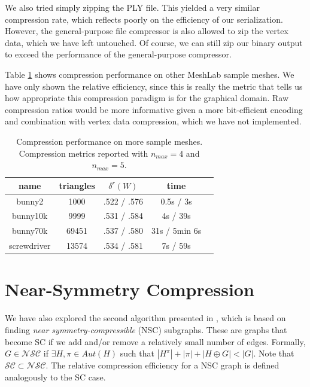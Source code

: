 \documentclass{egpubl}
\begin{document}
We also tried simply zipping the PLY file. This yielded a very similar compression rate, which reflects poorly on the efficiency of our serialization. However, the general-purpose file compressor is also allowed to zip the vertex data, which we have left untouched. Of course, we can still zip our binary output to exceed the performance of the general-purpose compressor.


Table \ref{tab:more_meshes} shows compression performance on other MeshLab sample meshes.
We have only shown the relative efficiency, since this is really the metric that tells us how appropriate this compression paradigm is for the graphical domain. Raw compression ratios would be more informative given a more bit-efficient encoding and combination with vertex data compression, which we have not implemented.

\begin{table}
\centering
\begin{tabular}{|c|c|c|c|c|}
\hline
name & triangles & $\delta^r(W)$ & time \\
\hline
bunny2 & 1000 & .522 / .576 & 0.5s / 3s \\
bunny10k & 9999 & .531 / .584 & 4s / 39s \\
bunny70k & 69451 & .537 / .580 & 31s / 5min 6s \\
screwdriver & 13574 & .534 / .581 & 7s / 59s \\
\hline
\end{tabular}
\caption{Compression performance on more sample meshes. Compression metrics reported with $n_{max} = 4$ and $n_{max} = 5$.}
\label{tab:more_meshes}
\end{table}



\section{Near-Symmetry Compression} \label{sec:near_symmetry}

We have also explored the second algorithm presented in \cite{cibej2021automorphisms}, which is based on finding \textit{near symmetry-compressible} (NSC) subgraphs.
These are graphs that become SC if we add and/or remove a relatively small number of edges.
Formally, $G \in \mathcal{N}\mathcal{S}\mathcal{C}$ if $\exists H, \pi \in Aut(H)$ such that $|H^\pi| + |\pi| + |H \oplus G| < |G|$. Note that $\mathcal{S}\mathcal{C} \subset \mathcal{N}\mathcal{S}\mathcal{C}$.
The relative compression efficiency for a NSC graph is defined analogously to the SC case.
\end{document}
